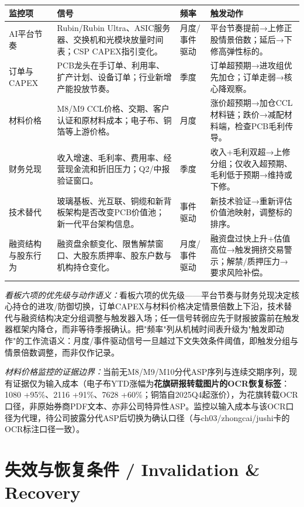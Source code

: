 \begin{dashboardbox}[监控看板]
\small
\begin{tabularx}{\textwidth}{L{2.8cm}X L{2.5cm} L{2.8cm}}
\toprule
\textbf{监控项} & \textbf{信号} & \textbf{频率} & \textbf{触发动作} \\
\midrule
AI平台节奏 & Rubin/Rubin Ultra、ASIC服务器、交换机和光模块放量时间表；CSP CAPEX指引变化。 & 月度/事件驱动 & 平台节奏提前→上修正股情景倍数；延后→下修高弹性标的。 \\
订单与CAPEX & PCB龙头在手订单、利用率、扩产计划、设备订单；行业新增产能投放节奏。 & 季度 & 订单超预期→进攻组优先加仓；订单走弱→核心降观察。 \\
材料价格 & M8/M9 CCL价格、交期、客户认证和原材料成本；电子布、铜箔等上游价格。 & 月度 & 涨价超预期→加仓CCL材料链；跌价→减配材料端，检查PCB毛利传导。 \\
财务兑现 & 收入增速、毛利率、费用率、经营现金流和折旧压力；Q2/中报验证窗口。 & 季度 & 收入+毛利双超→上修分组；仅收入超预期、毛利低于预期→维持或下修。 \\
技术替代 & 玻璃基板、光互联、铜缆和新背板架构是否改变PCB价值池；新一代平台架构信息。 & 事件驱动 & 新技术验证→重新评估价值池映射，调整标的排序。 \\
融资结构与股东行为 & 融资盘余额变化、限售解禁窗口、大股东质押率、股东户数与机构持仓变化。 & 月度/事件驱动 & 融资盘过快上升+估值高位→触发拥挤交易警示；解禁/质押压力→要求风险补偿。 \\
\bottomrule
\end{tabularx}
\end{dashboardbox}

\textit{看板六项的优先级与动作语义：}看板六项的优先级——平台节奏与财务兑现决定核心持仓的进攻/防御切换，订单CAPEX与材料价格决定情景倍数上下沿，技术替代与融资结构决定分组调整与触发器入场；任一信号转弱应先于财报披露前在触发器框架内降仓，而非等待季报确认。把"频率"列从机械时间表升级为"触发即动作"的工作流语义：月度/事件驱动信号一旦越过下文失效条件阈值，即触发分组与情景倍数调整，而非仅作记录。

\textit{材料价格监控的证据边界：}当前无M8/M9/M10分代ASP序列与连续交期序列，现有证据仅为输入成本（电子布YTD涨幅为\textbf{花旗研报转载图片的OCR恢复标签}：1080 +95\%、2116 +91\%、7628 +60\%；铜箔自2025Q4起涨价），为花旗转载OCR口径，非原始券商PDF文本、亦非公司特异性ASP。监控以输入成本与该OCR口径为代理，待公司披露分代ASP后切换为确认口径（与ch03/zhongcai/jushi卡的OCR标注口径一致）。

\section{失效与恢复条件 / Invalidation \& Recovery}

